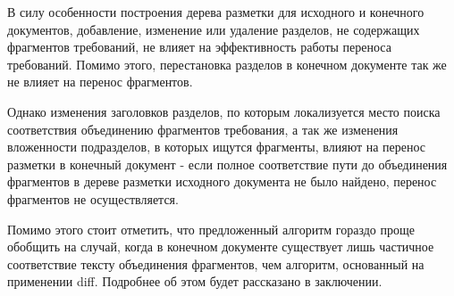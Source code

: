 В силу особенности построения дерева разметки для исходного и конечного документов, добавление, изменение или удаление разделов, не содержащих фрагментов требований, не влияет на эффективность работы переноса требований. Помимо этого, перестановка разделов в конечном документе так же не влияет на перенос фрагментов. 

Однако изменения заголовков разделов, по которым локализуется место поиска соответствия объединению фрагментов требования, а так же изменения вложенности подразделов, в которых ищутся фрагменты, влияют на перенос разметки в конечный документ - если полное соответствие пути до объединения фрагментов в дереве разметки исходного документа не было найдено, перенос фрагментов не осуществляется.

Помимо этого стоит отметить, что предложенный алгоритм гораздо проще обобщить на случай, когда в конечном документе существует лишь частичное соответствие тексту объединения фрагментов, чем алгоритм, основанный на применении diff. Подробнее об этом будет рассказано в заключении.